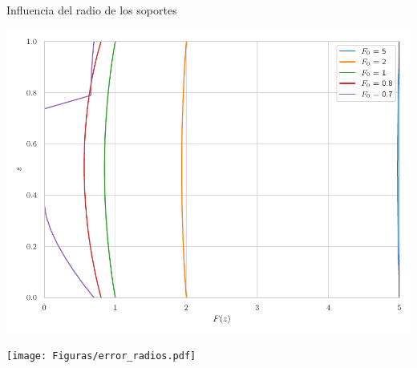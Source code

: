 \documentclass[11pt]{beamer}
\begin{document}
		\begin{frame}{Influencia del radio de los soportes}
			\justifying
			\begin{minipage}[b]{0.48\textwidth}
                    \centering
                    \includegraphics[height=0.5 \textheight]{Figuras/sol_radios.pdf}
                \end{minipage}
                \hfill
                \begin{minipage}[b]{0.48\textwidth}
                    \centering
                    \texttt{[image: Figuras/error\_radios.pdf]}
                \end{minipage}
		\end{frame}
\end{document}
